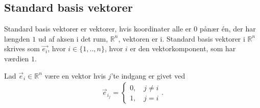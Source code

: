 \subsection{Standard basis vektorer}
Standard basis vektorer er vektorer, hvis koordinater alle er $0$ pånær én, der har længden $1$ ud af aksen i det rum, $\mathds{R}^n$, vektoren er i. Standard basis vektorer i $\mathds{R}^n$ skrives som $\vec{e_i}$, hvor $i\in \{1,..,n\}$, hvor $i$ er den vektorkomponent, som har værdien $1$. 

\begin{defn}
Lad $\vec{e}_{i}\in\mathds{R}^n$ være en vektor hvis $j$'te indgang er givet ved
\begin{align*}
\vec{e}_{i_{j}}=\begin{cases} 0, \quad j \neq i
\\ 1 , \quad j = i \end{cases}.
\end{align*}

\end{defn}

